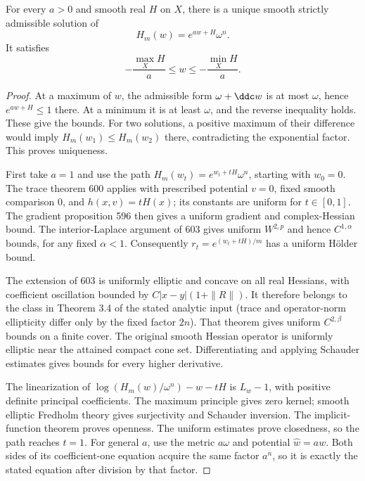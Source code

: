 \begin{lemma}\label{draft:604-smooth-proper-existence}
For every $a>0$ and smooth real $H$ on $X$, there is a unique smooth
strictly admissible solution of
\[
 H_m(w)=e^{aw+H}\omega^n.
\]
It satisfies
\[
 -\frac{\max_X H}{a}\leq w\leq-\frac{\min_X H}{a}.
\]
\end{lemma}
\begin{proof}
At a maximum of $w$, the admissible form $\omega+\ddc w$ is at most
$\omega$, hence $e^{aw+H}\leq1$ there. At a minimum it is at least
$\omega$, and the reverse inequality holds. These give the bounds.
For two solutions, a positive maximum of their difference would imply
$H_m(w_1)\leq H_m(w_2)$ there, contradicting the exponential factor.
This proves uniqueness.

First take $a=1$ and use the path
$H_m(w_t)=e^{w_t+tH}\omega^n$, starting with $w_0=0$.
The trace theorem 600 applies with prescribed potential $v=0$,
fixed smooth comparison $0$, and $h(x,v)=tH(x)$; its constants are
uniform for $t\in[0,1]$. The gradient proposition 596 then gives a
uniform gradient and complex-Hessian bound. The interior-Laplace argument
of 603 gives uniform $W^{2,p}$ and hence $C^{1,\alpha}$ bounds, for any
fixed $\alpha<1$. Consequently
$r_t=e^{(w_t+tH)/m}$ has a uniform H\"older bound.

The extension of 603 is uniformly elliptic and concave on all real
Hessians, with coefficient oscillation bounded by
$C|x-y|(1+\|R\|)$. It therefore belongs to the class in Theorem 3.4
of the stated analytic input (trace and operator-norm ellipticity differ
only by the fixed factor $2n$). That theorem gives uniform $C^{2,\beta}$
bounds on a finite cover. The original smooth Hessian operator is
uniformly elliptic near the attained compact cone set. Differentiating
and applying Schauder estimates gives bounds for every higher derivative.

The linearization of
$\log(H_m(w)/\omega^n)-w-tH$ is $L_w-1$, with positive definite
principal coefficients. The maximum principle gives zero kernel;
smooth elliptic Fredholm theory gives surjectivity and Schauder inversion.
The implicit-function theorem proves openness. The uniform estimates
prove closedness, so the path reaches $t=1$.
For general $a$, use the metric $a\omega$ and potential $\widehat w=aw$.
Both sides of its coefficient-one equation acquire the same factor
$a^n$, so it is exactly the stated equation after division by that factor.
\end{proof}

